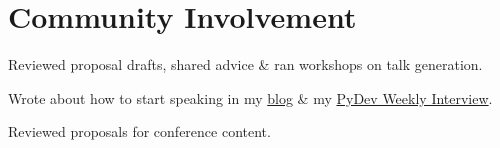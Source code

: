 \documentclass[letterpaper]{deedy-resume} %
\begin{document}
\begin{minipage}[t]{0.66\textwidth}
\sectionspace %
\vspace{-0.8\baselineskip}
%
%

\section{Community Involvement}

%
\begin{tightitemize}
\item Reviewed proposal drafts, shared advice \& ran workshops on talk generation.
\item Wrote about how to start speaking in my \href{http://veronicahanus.com/blog.html}{blog} \& my \href{http://www.blog.pythonlibrary.org/2019/09/16/pydev-of-the-week-veronica-hanus/}{PyDev Weekly Interview}.
\end{tightitemize}
%
\sectionspace %


% 
\begin{tightitemize}
\item Reviewed proposals for conference content.
\end{tightitemize}
%
\sectionspace %
\vspace{0.2\baselineskip}


\end{minipage}
\end{document}
